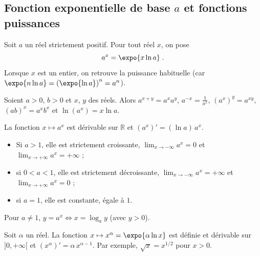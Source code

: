       \subsection{Fonction exponentielle de base $a$ et fonctions puissances}
            \begin{defi}
                  Soit $a$ un r\'eel strictement positif. Pour tout r\'eel $x$, on pose
                  \[ a^x = \expo{x \ln a} \;. \]
                  Lorsque $x$ est un entier, on retrouve la puissance habituelle (car $\expo{n \ln a} = \left(\expo{\ln a}\right)^n = a^n$).
            \end{defi}
            \begin{prop}
                  Soient $a > 0$, $b > 0$ et $x$, $y$ des r\'eels. Alors
                  $a^{x+y} = a^x a^y$, $a^{-x} = \frac{1}{a^x}$, $\left(a^x\right)^y = a^{xy}$, $(ab)^x = a^x b^x$ et $\ln\left(a^x\right) = x \ln a$.

                  La fonction $x \mapsto a^x$ est d\'erivable sur $\mathbb{R}$ et $\left(a^x\right)' = (\ln a)\, a^x$.
                  \begin{itemize}
                        \item Si $a > 1$, elle est strictement croissante, $\lim_{x \rightarrow -\infty} a^x = 0$ et $\lim_{x \rightarrow +\infty} a^x = +\infty$ ;
                        \item si $0 < a < 1$, elle est strictement d\'ecroissante, $\lim_{x \rightarrow -\infty} a^x = +\infty$ et $\lim_{x \rightarrow +\infty} a^x = 0$ ;
                        \item si $a = 1$, elle est constante, \'egale \`a $1$.
                  \end{itemize}
                  Pour $a \neq 1$, $y = a^x \iff x = \log_a y$ (avec $y > 0$).
            \end{prop}
            \begin{prop}
                  Soit $\alpha$ un r\'eel. La fonction $x \mapsto x^\alpha = \expo{\alpha \ln x}$ est d\'efinie et d\'erivable sur $]0,+\infty[$ et
                  $\left(x^\alpha\right)' = \alpha\, x^{\alpha - 1}$.
                  Par exemple, $\sqrt{x} = x^{1/2}$ pour $x > 0$.
            \end{prop}
      




\TCDLessonStyleOff
\clearpage
\providecommand{\ivec}{\vec{\imath}}
\providecommand{\jvec}{\vec{\jmath}}
\providecommand{\Oij}{$(O,\ivec,\jvec)$ }
